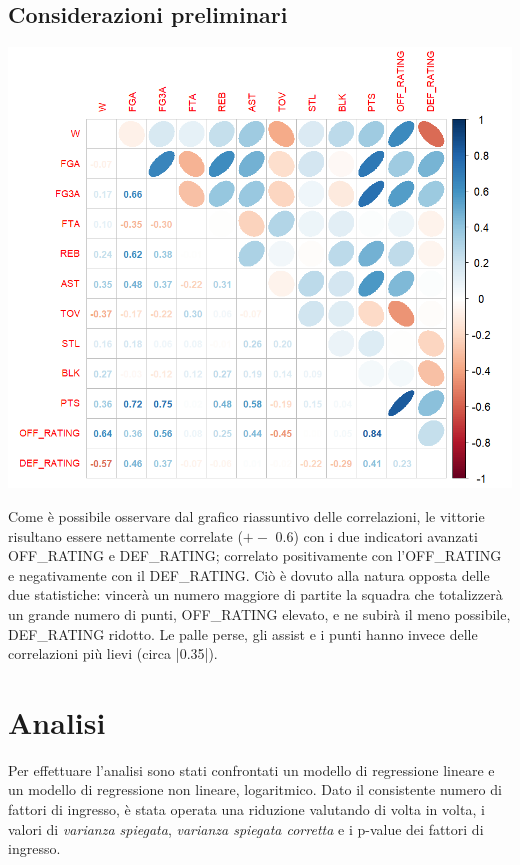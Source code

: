 \documentclass[11pt,a4paper]{article}
\begin{document}
\subsection{Considerazioni preliminari}
\begin{minipage}{0.5\textwidth} 
    \hspace{-1.30cm}
    \includegraphics[scale=.5]{imgs/correlation_plot.png}
\end{minipage}
\begin{minipage}{0.5\textwidth} 
    Come è possibile osservare dal grafico riassuntivo delle correlazioni, le vittorie risultano essere nettamente correlate ($+-$ 0.6) con i due indicatori avanzati OFF\_RATING e DEF\_RATING; correlato positivamente con l'OFF\_RATING e negativamente con il DEF\_RATING. Ciò è dovuto alla natura opposta delle due statistiche: vincerà un numero maggiore di partite la squadra che totalizzerà un grande numero di punti, OFF\_RATING elevato, e ne subirà il meno possibile, DEF\_RATING ridotto.
    Le palle perse, gli assist e i punti hanno invece delle correlazioni più lievi (circa |0.35|).
\end{minipage}

\section{Analisi}
Per effettuare l'analisi sono stati confrontati un modello di regressione lineare e un modello di regressione non lineare, logaritmico. Dato il consistente numero di fattori di ingresso, è stata operata una riduzione valutando di volta in volta, i valori di \emph{varianza spiegata}, \emph{varianza spiegata corretta} e i p-value dei fattori di ingresso. 
\end{document}

